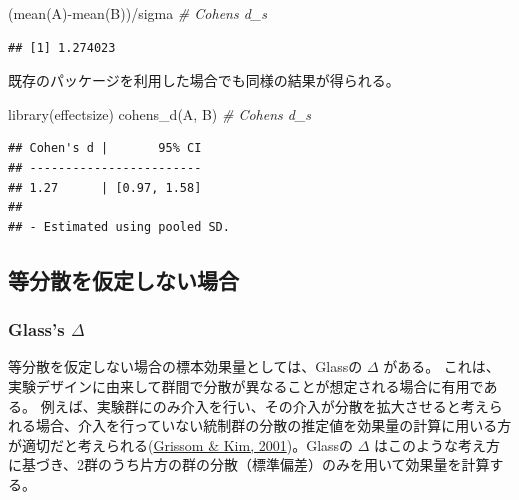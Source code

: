 \documentclass[
  ja=standard, xelatex, base=12pt]{bxjsreport}
\newenvironment{Shaded}{\begin{snugshade}}{\end{snugshade}}
\newcommand{\CommentTok}[1]{\textcolor[rgb]{0.56,0.35,0.01}{\textit{#1}}}
\newcommand{\FunctionTok}[1]{\textcolor[rgb]{0.00,0.00,0.00}{#1}}
\newcommand{\NormalTok}[1]{#1}
\newcommand{\SpecialCharTok}[1]{\textcolor[rgb]{0.00,0.00,0.00}{#1}}
\begin{document}
\begin{Shaded}
\begin{Highlighting}[]
\NormalTok{(}\FunctionTok{mean}\NormalTok{(A)}\SpecialCharTok{{-}}\FunctionTok{mean}\NormalTok{(B))}\SpecialCharTok{/}\NormalTok{sigma  }\CommentTok{\# Cohen\textquotesingle{}s d\_s}
\end{Highlighting}
\end{Shaded}

\begin{verbatim}
## [1] 1.274023
\end{verbatim}

既存のパッケージを利用した場合でも同様の結果が得られる。

\begin{Shaded}
\begin{Highlighting}[]
\FunctionTok{library}\NormalTok{(effectsize)}
\FunctionTok{cohens\_d}\NormalTok{(A, B)  }\CommentTok{\# Cohen\textquotesingle{}s d\_s}
\end{Highlighting}
\end{Shaded}

\begin{verbatim}
## Cohen's d |       95% CI
## ------------------------
## 1.27      | [0.97, 1.58]
## 
## - Estimated using pooled SD.
\end{verbatim}

\hypertarget{ux7b49ux5206ux6563ux3092ux4eeeux5b9aux3057ux306aux3044ux5834ux5408-1}{%
\subsection{等分散を仮定しない場合}\label{ux7b49ux5206ux6563ux3092ux4eeeux5b9aux3057ux306aux3044ux5834ux5408-1}}

\hypertarget{glasss-delta-1}{%
\subsubsection{\texorpdfstring{Glass's \(\Delta\)}{Glass's \textbackslash Delta}}\label{glasss-delta-1}}

等分散を仮定しない場合の標本効果量としては、Glassの \(\Delta\) がある。 これは、実験デザインに由来して群間で分散が異なることが想定される場合に有用である。 例えば、実験群にのみ介入を行い、その介入が分散を拡大させると考えられる場合、介入を行っていない統制群の分散の推定値を効果量の計算に用いる方が適切だと考えられる(\protect\hyperlink{ref-grissom2001}{Grissom \& Kim, 2001})。Glassの \(\Delta\) はこのような考え方に基づき、2群のうち片方の群の分散（標準偏差）のみを用いて効果量を計算する。
\end{document}
